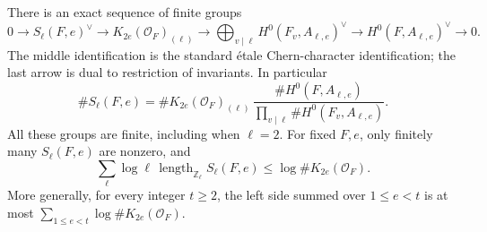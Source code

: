 \begin{proposition}
\label{AC-K10}
There is an exact sequence of finite groups
\[
 0\longrightarrow S_\ell(F,e)^\vee
 \longrightarrow K_{2e}(\mathcal O_F)_{(\ell)}
 \longrightarrow\bigoplus_{v\mid\ell}
                     H^0(F_v,A_{\ell,e})^\vee
 \longrightarrow H^0(F,A_{\ell,e})^\vee
 \longrightarrow0.                                      \tag{K10.1}
\]
The middle identification is the standard \'etale Chern-character
identification; the last arrow is dual to restriction of invariants.
In particular
\[
 \#S_\ell(F,e)=
 \#K_{2e}(\mathcal O_F)_{(\ell)}\,
 \frac{\#H^0(F,A_{\ell,e})}
      {\prod_{v\mid\ell}\#H^0(F_v,A_{\ell,e})}.          \tag{K10.2}
\]
All these groups are finite, including when $\ell=2$.  For fixed
$F,e$, only finitely many $S_\ell(F,e)$ are nonzero, and
\[
 \sum_\ell \log\ell\,
       \operatorname{length}_{\mathbb Z_\ell}S_\ell(F,e)
 \leq\log\#K_{2e}(\mathcal O_F).                         \tag{K10.3}
\]
More generally, for every integer $t\geq2$, the left side summed
over $1\leq e<t$ is at most
$\sum_{1\leq e<t}\log\#K_{2e}(\mathcal O_F)$.
\end{proposition}
